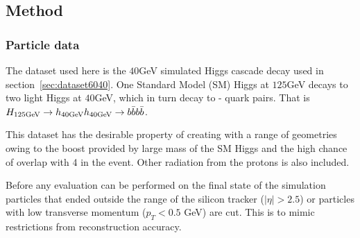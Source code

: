 \subsection{Method}
\subsubsection{Particle data}
The dataset used here is the \(40\)GeV simulated Higgs cascade decay used in section~\ref{sec:dataset6040}.
One Standard Model (SM) Higgs at \(125\)GeV decays to two light Higgs at \(40\)GeV,
which in turn decay to \beau{}-\bbar{} quark pairs.
That is \(H_{125\text{GeV}} \rightarrow h_{40\text{GeV}} h_{40\text{GeV}} \rightarrow b \bar{b} b \bar{b}\).


This dataset has the desirable property of creating  with a range of geometries
owing to the boost provided by large mass of the SM Higgs and
the high chance of overlap with 4  in the event.
Other radiation from the protons is also included.  %


Before any evaluation can be performed on the final state of the simulation
particles that ended outside the range of the silicon tracker (\(|\eta|>2.5\))
or particles with low transverse momentum (\(p_T < 0.5\) GeV) are cut.
This is to mimic restrictions from reconstruction accuracy.

